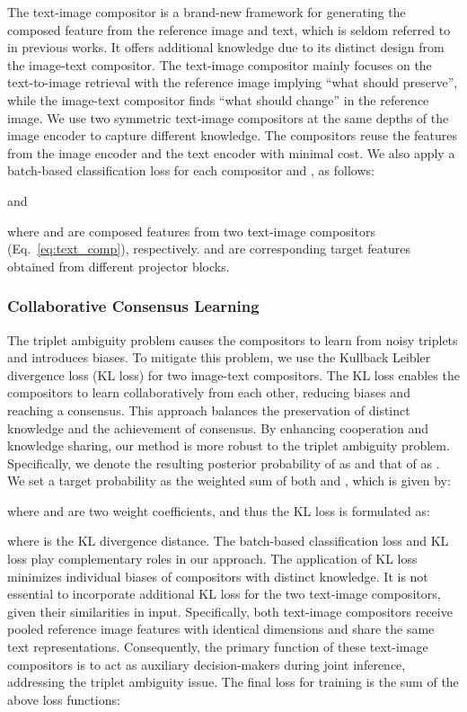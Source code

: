 \documentclass[sigconf]{acmart}
\begin{document}
The text-image compositor is a brand-new framework for generating the composed feature from the reference image and text, which is seldom referred to in previous works. It offers additional knowledge due to its distinct design from the image-text compositor. The text-image compositor mainly focuses on the text-to-image retrieval with the reference image implying ``what should preserve'', while the image-text compositor finds ``what should change'' in the reference image. We use two symmetric text-image compositors at the same depths of the image encoder to capture different knowledge. The compositors reuse the features from the image encoder  and the text encoder with minimal cost. We also apply a batch-based classification loss for each compositor  and , as follows:

and

where  and  are composed features from two text-image compositors (Eq.~\ref{eq:text_comp}), respectively.  and  are corresponding target features obtained from different projector blocks. 

\subsubsection{Collaborative Consensus Learning}
The triplet ambiguity problem causes the compositors to learn from noisy triplets and introduces biases. To mitigate this problem, we use the Kullback Leibler divergence loss (KL loss) for two image-text compositors. The KL loss enables the compositors to learn collaboratively from each other, reducing biases and reaching a consensus. This approach balances the preservation of distinct knowledge and the achievement of consensus. By enhancing cooperation and knowledge sharing, our method is more robust to the triplet ambiguity problem. 
Specifically, we denote the resulting posterior probability of  as  and that of  as . We set a target probability  as the weighted sum of both  and , which is given by:

where  and  are two weight coefficients, and thus the KL loss is formulated as:

where  is the KL divergence distance. The batch-based classification loss and KL loss play complementary roles in our approach. The application of KL loss minimizes individual biases of compositors with distinct knowledge. It is not essential to incorporate additional KL loss for the two text-image compositors, given their similarities in input. Specifically, both text-image compositors receive pooled reference image features with identical dimensions and share the same text representations. Consequently, the primary function of these text-image compositors is to act as auxiliary decision-makers during joint inference, addressing the triplet ambiguity issue.
The final loss for training is the sum of the above loss functions:
\end{document}
